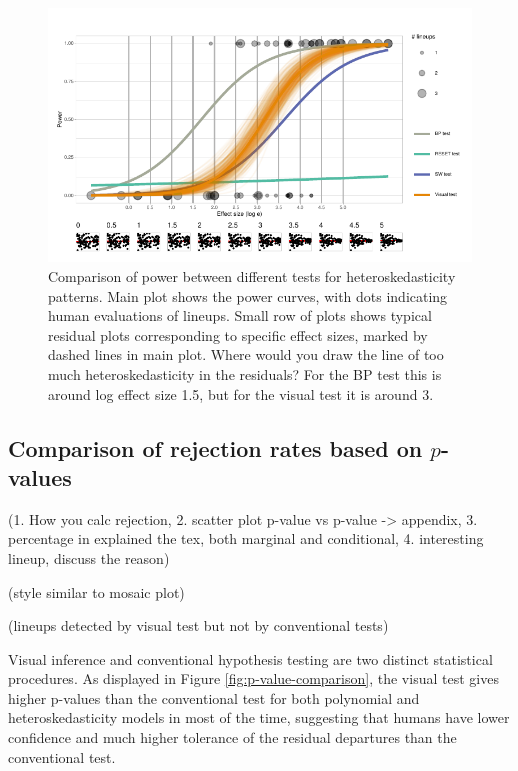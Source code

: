 \documentclass[]{interact}
\theoremstyle{plain}%
\theoremstyle{definition}
\theoremstyle{remark}
\begin{document}
\begin{figure}

{\centering \includegraphics[width=1\linewidth]{paper_comparison_files/figure-latex/heterpower-1} 

}

\caption{Comparison of power between different tests for heteroskedasticity patterns. Main plot shows the power curves, with dots indicating human evaluations of lineups. Small row of plots shows typical residual plots corresponding to specific effect sizes, marked by dashed lines in main plot. Where would you draw the line of too much heteroskedasticity in the residuals? For the BP test this is around log effect size 1.5, but for the visual test it is around 3.}\label{fig:heterpower}
\end{figure}

\hypertarget{comparison-of-rejection-rates-based-on-p-values}{%
\subsection{\texorpdfstring{Comparison of rejection rates based on
\(p\)-values}{Comparison of rejection rates based on p-values}}\label{comparison-of-rejection-rates-based-on-p-values}}

(1. How you calc rejection, 2. scatter plot p-value vs p-value
-\textgreater{} appendix, 3. percentage in explained the tex, both
marginal and conditional, 4. interesting lineup, discuss the reason)

(style similar to mosaic plot)

(lineups detected by visual test but not by conventional tests)

Visual inference and conventional hypothesis testing are two distinct
statistical procedures. As displayed in Figure
\ref{fig:p-value-comparison}, the visual test gives higher p-values than
the conventional test for both polynomial and heteroskedasticity models
in most of the time, suggesting that humans have lower confidence and
much higher tolerance of the residual departures than the conventional
test.
\end{document}
